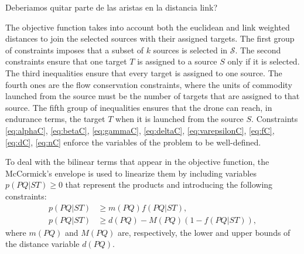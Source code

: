 \documentclass[a4paper,  review, authoryear, 1p.]{elsarticle}
\newcommand{\VB}{{V^{}_{\mathcal B}}}
\newcommand{\VN}{{V^{}_{\mathcal N}}}
\newcommand{\EN}{{E^{}_{\mathcal N}}}
\newcommand{\VTSP}{{V_{\text{TSP}}}}
\newcommand{\ETSP}{{E_{\text{TSP}}}}
\newcommand{\CV}[1]{{\color{atomictangerine}#1}}
\begin{document}
\CV{Deberiamos quitar parte de las aristas en la distancia link?}

The objective function takes into account \CV{both the euclidean and link weighted distances} to join the selected sources with their assigned targets. The first group of constraints imposes that a subset of $k$ sources is selected in $\mathcal S$. The second constraints ensure that one target $T$ is assigned to a source $S$ only if it is selected. The third inequalities ensure that every target is assigned to one source. The fourth ones are the flow conservation constraints, where the units of commodity launched from the source must be the number of targets that are assigned to that source. \CV{The fifth group of inequalities ensures that the drone can reach, in endurance terms, the target $T$ when it is launched from the source $S$.} Constraints \eqref{eq:alphaC}, \eqref{eq:betaC}, \eqref{eq:gammaC}, \eqref{eq:deltaC}, \eqref{eq:varepsilonC}, \eqref{eq:fC}, \eqref{eq:dC}, \eqref{eq:nC} enforce the variables of the problem to be well-defined. 

\CV{
To deal with the bilinear terms that appear in the objective function, the McCormick's envelope is used to linearize them by including variables $p(PQ|ST)\geq 0$ that represent the products and introducing the following constraints:
\begin{align*}
	p(PQ|ST) & \geq m(PQ) f(PQ|ST), \\
	p(PQ|ST) & \geq d(PQ) - M(PQ)(1 - f(PQ|ST)),
\end{align*}
where $m(PQ)$ and $M(PQ)$ are, respectively, the lower and upper bounds of the distance variable $d(PQ)$.
}
\end{document}
